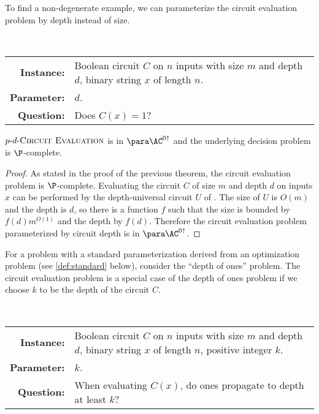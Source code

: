 To find a non-degenerate example, we can parameterize the circuit evaluation problem by depth instead of size.

\begin{definition}
  \mbox{} \\
  \begin{tabular}{r p{9.2cm}}
    \textbf{Instance:} & Boolean circuit $C$ on $n$ inputs with size $m$ and depth $d$, binary string $x$ of length $n$. \\
    \textbf{Parameter:} & $d$. \\
    \textbf{Question:} & Does $C(x) = 1$?
  \end{tabular}
\end{definition}

\begin{theorem}\label{thm:cvpdepth}
  $p \textnormal{-} d \textnormal{-} \textsc{Circuit Evaluation}$ is in $\para \AC^{0 \uparrow}$ and the underlying decision problem is $\P$-complete.
\end{theorem}
\begin{proof}
  As stated in the proof of the previous theorem, the circuit evaluation problem is $\P$-complete.
  Evaluating the circuit $C$ of size $m$ and depth $d$ on inputs $x$ can be performed by the depth-universal circuit $U$ of \autocite{ch85}.
  The size of $U$ is $O(m)$ and the depth is $d$, so there is a function $f$ such that the size is bounded by $f(d) m^{O(1)}$ and the depth by $f(d)$.
  Therefore the circuit evaluation problem parameterized by circuit depth is in $\para \AC^{0 \uparrow}$.
\end{proof}

For a problem with a standard parameterization derived from an optimization problem (see \autoref{def:standard} below), consider the ``depth of ones'' problem.
The circuit evaluation problem is a special case of the depth of ones problem if we choose $k$ to be the depth of the circuit $C$.

\begin{definition}
  \mbox{} \\
  \begin{tabular}{r p{9.2cm}}
    \textbf{Instance:} & Boolean circuit $C$ on $n$ inputs with size $m$ and depth $d$, binary string $x$ of length $n$, positive integer $k$. \\
    \textbf{Parameter:} & $k$. \\
    \textbf{Question:} & When evaluating $C(x)$, do ones propagate to depth at least $k$?
  \end{tabular}
\end{definition}

